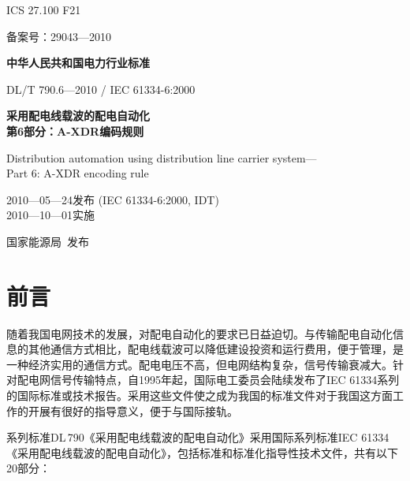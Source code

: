 \documentclass[a4paper,11pt]{ctexart}
\begin{document}
\begin{center}
\vspace*{2cm}

{\Large ICS 27.100 \qquad F21}

\vspace{1cm}
备案号：29043---2010

\vspace{2cm}
{\LARGE\bfseries 中华人民共和国电力行业标准}

\vspace{1cm}
{\Large DL/T 790.6---2010 / IEC 61334-6:2000}

\vspace{1.5cm}
{\LARGE\bfseries 采用配电线载波的配电自动化\\[0.5em] 第6部分：A-XDR编码规则}

\vspace{1cm}
{\normalsize Distribution automation using distribution line carrier system---\\
Part 6: A-XDR encoding rule}

\vspace{2cm}
2010---05---24发布 \qquad (IEC 61334-6:2000, IDT)\\[0.5em]
2010---10---01实施

\vspace{2cm}
{\Large 国家能源局\ 发布}

\end{center}
\newpage

\section*{前言}

随着我国电网技术的发展，对配电自动化的要求已日益迫切。与传输配电自动化信息的其他通信方式相比，配电线载波可以降低建设投资和运行费用，便于管理，是一种经济实用的通信方式。配电电压不高，但电网结构复杂，信号传输衰减大。针对配电网信号传输特点，自1995年起，国际电工委员会陆续发布了IEC 61334系列的国际标准或技术报告。采用这些文件使之成为我国的标准文件对于我国这方面工作的开展有很好的指导意义，便于与国际接轨。

系列标准DL\,790《采用配电线载波的配电自动化》采用国际系列标准IEC 61334《采用配电线载波的配电自动化》，包括标准和标准化指导性技术文件，共有以下20部分：
\end{document}
